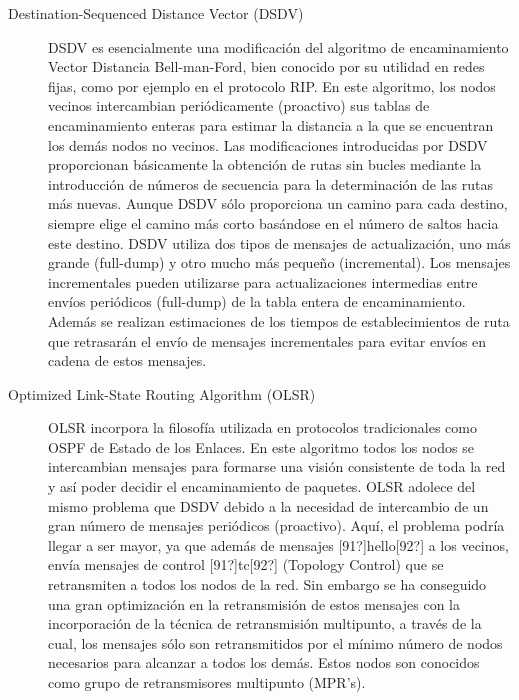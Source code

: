 \begin{description}
\item[Destination-Sequenced Distance Vector (DSDV)] 
DSDV es esencialmente una modificaci\'on del algoritmo de
encaminamiento Vector Distancia Bell-man-Ford, bien conocido por su utilidad en redes fijas, como por ejemplo en el
protocolo RIP. En este algoritmo, los nodos vecinos intercambian peri\'odicamente (proactivo) sus tablas de
encaminamiento enteras para estimar la distancia a la que se encuentran los dem\'as nodos no vecinos. Las modificaciones
introducidas por DSDV proporcionan b\'asicamente la obtenci\'on de rutas sin bucles mediante la introducci\'on de n\'umeros de
secuencia para la determinaci\'on de las rutas m\'as nuevas. Aunque DSDV s\'olo proporciona un camino para cada destino,
siempre elige el camino m\'as corto bas\'andose en el n\'umero de saltos hacia este destino. DSDV utiliza dos tipos de
mensajes de actualizaci\'on, uno m\'as grande (full-dump) y otro mucho m\'as peque\~no (incremental). Los mensajes
incrementales pueden utilizarse para actualizaciones intermedias entre env\'ios peri\'odicos (full-dump) de la tabla entera
de encaminamiento. Adem\'as se realizan estimaciones de los tiempos de establecimientos de ruta que retrasar\'an el env\'io
de mensajes incrementales para evitar env\'ios en cadena de estos mensajes. 

\item[Optimized Link-State Routing Algorithm (OLSR)]
OLSR incorpora la filosof\'ia utilizada en protocolos tradicionales
como OSPF de Estado de los Enlaces. En este algoritmo todos los nodos se intercambian mensajes para formarse
una visi\'on consistente de toda la red y as\'i poder decidir el encaminamiento de paquetes. OLSR adolece del mismo
problema que DSDV debido a la necesidad de intercambio de un gran n\'umero de mensajes peri\'odicos (proactivo). Aqu\'i, el
problema podr\'ia llegar a ser mayor, ya que adem\'as de mensajes [91?]hello[92?] a los vecinos, env\'ia mensajes de control
[91?]tc[92?] (Topology Control) que se retransmiten a todos los nodos de la red. Sin embargo se ha conseguido una gran
optimizaci\'on en la retransmisi\'on de estos mensajes con la incorporaci\'on de la t\'ecnica de retransmisi\'on multipunto, a
trav\'es de la cual, los mensajes s\'olo son retransmitidos por el m\'inimo n\'umero de nodos necesarios para alcanzar a todos
los dem\'as. Estos nodos son conocidos como grupo de retransmisores multipunto (MPR's). 


\end{description}
